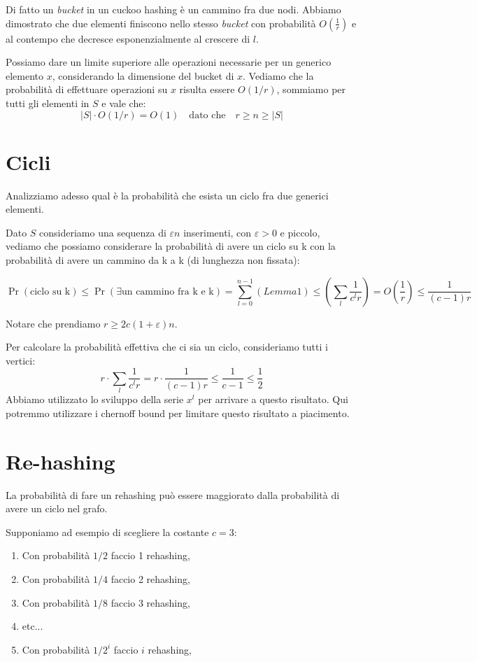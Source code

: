 \documentclass[a4paper,11pt]{book}
\begin{document}
Di fatto un \emph{bucket} in un cuckoo hashing \`e un cammino fra due nodi. Abbiamo dimostrato che due elementi finiscono nello stesso \emph{bucket} con probabilit\`a $O(\frac{1}{r})$ e al contempo che decresce esponenzialmente al crescere di $l$.

Possiamo dare un limite superiore alle operazioni necessarie per un generico elemento $x$, considerando la dimensione del bucket di $x$. Vediamo che la probabilit\`a di effettuare operazioni su $x$ risulta essere $O(1/r)$, sommiamo per tutti gli elementi in $S$ e vale che: $$|S| \cdot O(1/r) = O(1) \quad \mbox{dato che} \quad r \geq n \geq |S|$$

\section{Cicli}

Analizziamo adesso qual \`e la probabilit\`a che esista un ciclo fra due generici elementi.

Dato $S$ consideriamo una sequenza di $\varepsilon n$ inserimenti, con $\varepsilon > 0$ e piccolo, vediamo che possiamo considerare la probabilit\`a di avere un ciclo  su k con la probabilit\`a di avere un cammino da k a k (di lunghezza non fissata):

$$\Pr(\mbox{ciclo su k}) \leq \Pr(\exists \mbox{un cammino fra k e k}) = \sum_{l=0}^{n-1}(Lemma1) \leq \left(\sum_{l}\frac{1}{c^l r} \right) = O\left(\frac{1}{r}\right) \leq \frac{1}{(c-1)r}$$

Notare che prendiamo $r \geq 2c(1+\varepsilon)n$.

Per calcolare la probabilit\`a effettiva che ci sia un ciclo, consideriamo tutti i vertici:
$$ r \cdot \sum_{l}\frac{1}{c^l r} = r \cdot \frac{1}{(c-1)r} \leq \frac{1}{c-1} \leq \frac{1}{2}$$
Abbiamo utilizzato lo sviluppo della serie $x^l$ per arrivare a questo risultato. Qui potremmo utilizzare i chernoff bound per limitare questo risultato a piacimento.

\section{Re-hashing}

La probabilit\`a di fare un rehashing pu\`o essere maggiorato dalla probabilit\`a di avere un ciclo nel grafo.

Supponiamo ad esempio di scegliere la costante $c=3$:
\begin{enumerate}
\item Con probabilit\`a $1/2$ faccio 1 rehashing,
\item Con probabilit\`a $1/4$ faccio 2 rehashing,
\item Con probabilit\`a $1/8$ faccio 3 rehashing,
\item etc...
\item Con probabilit\`a $1/2^i$ faccio $i$ rehashing,
\end{enumerate}
\end{document}
